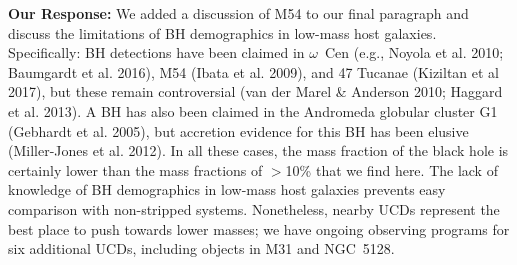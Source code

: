 \documentclass[11pt]{article}
\begin{document}
\vspace{0.2cm}
{\bf Our Response:} We added a discussion of M54 to our final paragraph and discuss the limitations of BH demographics in low-mass host galaxies. Specifically: BH detections have been claimed in $\omega$~Cen (e.g., Noyola et al. 2010; Baumgardt et al. 2016), M54 (Ibata et al. 2009), and 47 Tucanae (Kiziltan et al 2017), but these remain controversial (van der Marel \& Anderson 2010; Haggard et al. 2013).  A BH has also been claimed in the Andromeda globular cluster G1 (Gebhardt et al. 2005), but accretion evidence for this BH has been elusive (Miller-Jones et al. 2012).  In all these cases, the mass fraction of the black hole is certainly lower than the mass fractions of $>$10\% that we find here.  The lack of knowledge of BH demographics in low-mass host galaxies prevents easy comparison with non-stripped systems. Nonetheless, nearby UCDs represent the best place to push towards lower masses; we have ongoing observing programs for six additional UCDs, including objects in M31 and NGC~5128. 
\end{document}
